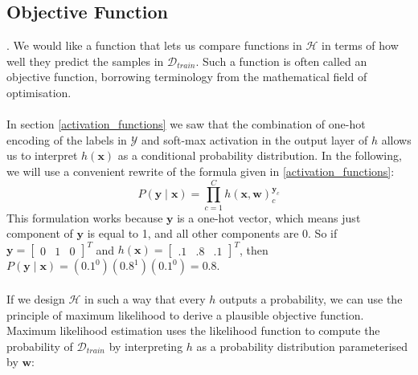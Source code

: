 \subsection{Objective Function}
\label{objectiveFunction}.
We would like a function that lets us compare functions in $\mathcal{H}$ in terms of how well they predict the samples in $\mathcal{D}_{train}$. Such a function is often called an objective function, borrowing terminology from the mathematical field of optimisation.
\\\\
In section \ref{activation_functions} we saw that the combination of one-hot encoding of the labels in $\mathcal{Y}$ and soft-max activation in the output layer of $h$ allows us to interpret $h(\mathbf{x})$ as a conditional probability distribution. In the following, we will use a convenient rewrite of the formula given in \ref{activation_functions}:
$$
P(\mathbf{y} \mid \mathbf{x}) = \prod\limits_{c=1}^C h(\mathbf{x},\mathbf{w})^{\mathbf{y}_c}_c
$$
This formulation works because $\mathbf{y}$ is a one-hot vector, which means just component of $\mathbf{y}$ is equal to 1, and all other components are 0. So if $\mathbf{y} = \begin{bmatrix}0 & 1 & 0 \end{bmatrix}^T$ and $h(\mathbf{x}) = \begin{bmatrix}.1 & .8 & .1 \end{bmatrix}^T$, then $P(\mathbf{y} \mid \mathbf{x}) = (0.1^0)(0.8^1)(0.1^0) = 0.8$.
\\\\
If we design $\mathcal{H}$ in such a way that every $h$ outputs a probability, we can use the principle of maximum likelihood to derive a plausible objective function. Maximum likelihood estimation uses the likelihood function to compute the probability of $\mathcal{D}_{train}$ by interpreting $h$ as a probability distribution parameterised by $\mathbf{w}$:

